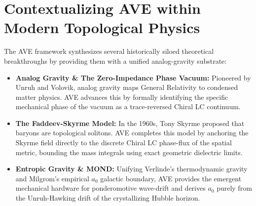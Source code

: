 \section*{Contextualizing AVE within Modern Topological Physics}
The AVE framework synthesizes several historically siloed theoretical breakthroughs by providing them with a unified analog-gravity substrate:
\begin{itemize}
    \item \textbf{Analog Gravity \& The Zero-Impedance Phase Vacuum:} Pioneered by Unruh and Volovik, analog gravity maps General Relativity to condensed matter physics. AVE advances this by formally identifying the specific mechanical phase of the vacuum as a trace-reversed Chiral LC continuum.
    \item \textbf{The Faddeev-Skyrme Model:} In the 1960s, Tony Skyrme proposed that baryons are topological solitons. AVE completes this model by anchoring the Skyrme field directly to the discrete Chiral LC phase-flux of the spatial metric, bounding the mass integrals using exact geometric dielectric limits.
    \item \textbf{Entropic Gravity \& MOND:} Unifying Verlinde's thermodynamic gravity and Milgrom's empirical $a_0$ galactic boundary, AVE provides the emergent mechanical hardware for ponderomotive wave-drift and derives $a_0$ purely from the Unruh-Hawking drift of the crystallizing Hubble horizon.
\end{itemize}